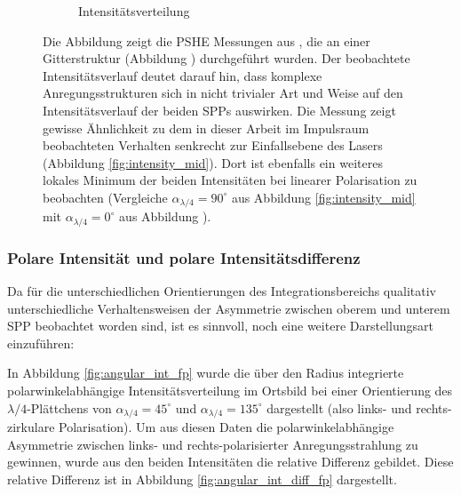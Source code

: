 \documentclass[titlepage,  ngerman]{article}
\begin{document}
\begin{figure}[h]
\begin{subfigure}{0.49\textwidth}
			\caption{Intensitätsverteilung}
			\label{fig:RF_measure_int}
		\end{subfigure}
		\caption[Vergleichsmessung aus \cite{RodriguezFortuno.2013}]{Die Abbildung  zeigt die PSHE Messungen aus \cite{RodriguezFortuno.2013}, die an einer Gitterstruktur (Abbildung ) durchgeführt wurden. Der beobachtete Intensitätsverlauf deutet darauf hin, dass komplexe Anregungsstrukturen sich in nicht trivialer Art und Weise auf den Intensitätsverlauf der beiden SPPs auswirken. Die Messung zeigt gewisse Ähnlichkeit zu dem in dieser Arbeit im Impulsraum beobachteten Verhalten senkrecht zur Einfallsebene des Lasers (Abbildung \ref{fig:intensity_mid}). Dort ist ebenfalls ein weiteres lokales Minimum der beiden Intensitäten bei linearer Polarisation zu beobachten (Vergleiche $\alpha_{\lambda/4}= 90^\circ$ aus Abbildung \ref{fig:intensity_mid} mit $\alpha_{\lambda/4}= 0^\circ$ aus Abbildung ).}
		\label{fig:RF_measure}		
	\end{figure}
	\FloatBarrier
	\subsubsection{Polare Intensität und polare Intensitätsdifferenz}
		\label{sec:polar_int}	
		Da für die unterschiedlichen Orientierungen des Integrationsbereichs qualitativ unterschiedliche Verhaltensweisen der Asymmetrie zwischen oberem und unterem SPP beobachtet worden sind, ist es sinnvoll, noch eine weitere Darstellungsart einzuführen:		
		
		 In Abbildung \ref{fig:angular_int_fp} wurde die über den Radius integrierte polarwinkelabhängige Intensitätsverteilung im Ortsbild bei einer Orientierung des $\lambda / 4$-Plättchens von $\alpha_{\lambda/4} = 45^\circ$ und  $\alpha_{\lambda/4} = 135^\circ$ dargestellt (also links- und rechts-zirkulare Polarisation). Um aus diesen Daten die polarwinkelabhängige Asymmetrie zwischen links- und rechts-polarisierter Anregungsstrahlung zu gewinnen, wurde aus den beiden Intensitäten die relative Differenz gebildet. Diese relative Differenz ist in Abbildung \ref{fig:angular_int_diff_fp} dargestellt.
\end{document}
